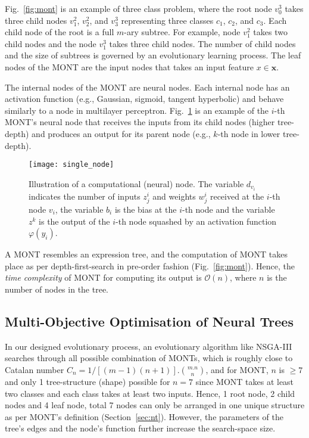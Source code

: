 \documentclass[conference]{IEEEtran}
\begin{document}
Fig.~\ref{fig:mont} is an example of three class problem, where the root node $ v_0^3 $ takes three child nodes $ v_1^2 $, $ v_2^2 $, and $ v_3^3 $ representing three classes $ c_1 $, $ c_2 $, and $ c_3 $. Each child node of the root is a full $ m $-ary subtree. For example, node $ v_1^2 $ takes two child nodes and the node $ v_1^3 $  takes three child nodes. The number of child nodes and the size of subtrees is governed by an evolutionary learning process. The leaf nodes of the MONT are the input nodes that takes an input feature $ x \in \textbf{x}$.

The internal nodes of the MONT are neural nodes. Each internal node has an activation function (e.g., Gaussian, sigmoid, tangent hyperbolic) and behave similarly to a node in multilayer perceptron. Fig.~\ref{fig:sing_node} is an example of the $ i $-th MONT's neural node that receives the inputs from its child nodes (higher tree-depth) and produces an output for its parent node (e.g., $ k $-th node in lower tree-depth).
\begin{figure}	
    \centerline{\texttt{[image: single\_node]}}
    \caption{ Illustration of a computational (neural) node. The variable $ d_{v_i} $ indicates the number of inputs $ z^i_j $ and weights $ w^i_j $ received at the $ i $-th node $ v_i $, the variable $ b_{i} $ is the bias at the $ i $-th node and the variable $ z^k $ is the output of the $ i $-th node squashed by an activation function $ \varphi(y_i) $.}
    \label{fig:sing_node}
\end{figure}

A MONT resembles an expression tree, and the computation of MONT takes place as per depth-first-search in pre-order fashion (Fig.~\ref{fig:mont}). Hence, the \textit{time complexity} of MONT for computing its output is $ \mathcal{O}(n) $, where $ n $ is the number of nodes in the tree.

\subsection{Multi-Objective Optimisation of Neural Trees}
\label{sec:mo_ec}
In our designed evolutionary process, an evolutionary algorithm like NSGA-III searches through all possible combination of MONTs, which is roughly close to Catalan number $ C_n = 1/[(m-1)(n+1)].{\binom{m.n}{n}}$, and for MONT, $ n $ is $ \ge 7 $ and only 1 tree-structure (shape) possible for $ n = 7$ since MONT takes at least two classes and each class takes at least two inputs. Hence, 1 root node, 2 child nodes and 4 leaf node, total 7 nodes can only be arranged in one unique structure as per MONT's definition (Section~\ref{sec:nt}). However, the parameters of the tree's edges and the node's function further increase the search-space size. 
\end{document}
